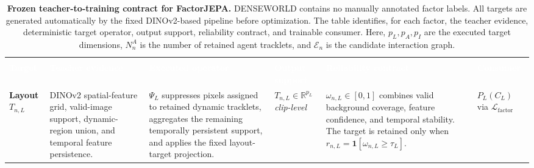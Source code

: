 \begin{table}[ht!]
\centering
\caption{
\textbf{Frozen teacher-to-training contract for FactorJEPA.}
DENSEWORLD contains no manually annotated factor labels. All targets
are generated automatically by the fixed DINOv2-based pipeline before
optimization. The table identifies, for each factor, the teacher
evidence, deterministic target operator, output support, reliability
contract, and trainable consumer. Here, \(p_L,p_A,p_I\) are the
executed target dimensions, \(N_n^A\) is the number of retained agent
tracklets, and \(\mathcal E_n\) is the candidate interaction graph.
}
\label{tab:factor_targets}

\scriptsize
\setlength{\tabcolsep}{3pt}
\renewcommand{\arraystretch}{1.22}

\begin{tabular}{
    >{\raggedright\arraybackslash}p{}
    >{\raggedright\arraybackslash}p{}
    >{\raggedright\arraybackslash}p{}
    >{\centering\arraybackslash}p{}
    >{\raggedright\arraybackslash}p{}
    >{\raggedright\arraybackslash}p{}
}
\toprule

\rowcolor{FTHeader}
\multicolumn{1}{c}{
\textcolor{white}{\textbf{Factor}}
}
&
\multicolumn{4}{c}{
\textcolor{white}{
\textbf{Frozen teacher-side target contract}
}
}
&
\multicolumn{1}{c}{
\textcolor{white}{
\textbf{Training side}
}
}
\\

\rowcolor{FTSubheader}
\textcolor{white}{\textbf{Target}}
&
\textcolor{white}{\textbf{Teacher evidence}}
&
\textcolor{white}{\textbf{Executed operator}}
&
\textcolor{white}{\textbf{Output support}}
&
\textcolor{white}{\textbf{Reliability contract}}
&
\textcolor{white}{\textbf{Consumer}}
\\
\midrule

\rowcolor{LayoutRow}
\cellcolor{LayoutCell}
\textbf{Layout}
\newline
\(T_{n,L}\)
&
DINOv2 spatial-feature grid, valid-image support, dynamic-region union,
and temporal feature persistence.
&
\(\Psi_L\) suppresses pixels assigned to retained dynamic tracklets,
aggregates the remaining temporally persistent support, and applies the
fixed layout-target projection.
&
\(
T_{n,L}
\in
\mathbb R^{p_L}
\)
\newline
\emph{clip-level}
&
\(\omega_{n,L}\in[0,1]\) combines valid background coverage, feature
confidence, and temporal stability. The target is retained only when
\(r_{n,L}=\mathbf 1[\omega_{n,L}\ge\tau_L]\).
&
\(P_L(C_L)\)
\newline
via
\(\mathcal L_{\mathrm{factor}}\)
\\


\end{tabular}
\end{table}
